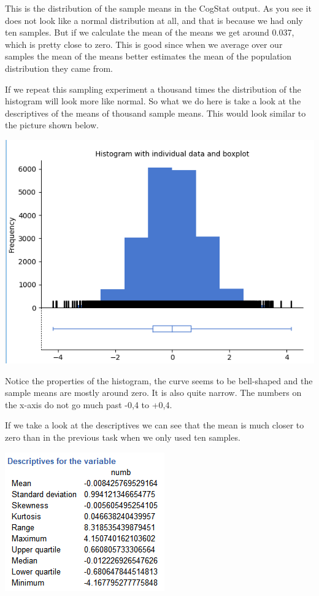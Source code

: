 \documentclass[
]{book}
\begin{document}
This is the distribution of the sample means in the CogStat output. As you see it does not look like a normal distribution at all, and that is because we had only ten samples. But if we calculate the mean of the means we get around 0.037, which is pretty close to zero. This is good since when we average over our samples the mean of the means better estimates the mean of the population distribution they came from.

If we repeat this sampling experiment a thousand times the distribution of the histogram will look more like normal. So what we do here is take a look at the descriptives of the means of thousand sample means. This would look similar to the picture shown below.

\includegraphics{img/ch4/4.6samplemeanshisto(moretrials).png}

Notice the properties of the histogram, the curve seems to be bell-shaped and the sample means are mostly around zero. It is also quite narrow. The numbers on the x-axis do not go much past -0,4 to +0,4.

If we take a look at the descriptives we can see that the mean is much closer to zero than in the previous task when we only used ten samples.

\includegraphics{img/ch4/4.6samplemeansdescriptives(more).png}
\end{document}
